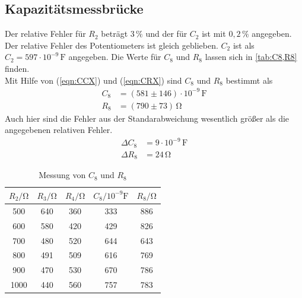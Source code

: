 \documentclass[
  bibliography=totoc,     %
  captions=tableheading,  %
  titlepage=firstiscover, %
]{scrartcl}
\begin{document}
  \subsection{Kapazitätsmessbrücke}
  Der relative Fehler für $R_2$ beträgt $3\,\%$ und der für $C_2$ ist mit $0,2 \,\%$ angegeben. Der relative Fehler des Potentiometers ist gleich geblieben.
  $C_2$ ist als $C_2 = 597 \cdot 10^{-9}\,\unit{\farad}$ angegeben. Die Werte für $C_8$ und $R_8$ lassen sich in \autoref{tab:C8,R8} finden.\\
  Mit Hilfe von (\autoref{eqn:CCX}) und (\autoref{eqn:CRX}) sind $C_8$ und $R_8$ bestimmt als
  \begin{align*}
    C_8 &= (581 \pm 146)\cdot 10^{-9} \,\unit{\farad} \\
    R_8 &= (790 \pm 73)\,\unit{\ohm}
  \end{align*}
  Auch hier sind die Fehler aus der Standarabweichung wesentlich größer als die angegebenen relativen Fehler.
  \begin{align*}
    \Delta C_{8} &= 9\cdot 10^{-9}\,\unit{\farad} \\
    \Delta R_{8} &= 24\,\unit{\ohm}
  \end{align*}


  \begin{table}[h]
    \centering
    \caption{Messung von $C_8$ und $R_8$}
    \label{tab:C8,R8}
    \begin{tabular}{c c c c c}
      \toprule
      $R_2/\unit{\ohm}$ & $R_3/\unit{\ohm}$ & $R_4/\unit{\ohm}$ & $C_8/10^{-9}\unit{\farad}$ & $R_8/\unit{\ohm}$ \\
      \midrule
      500 & 640 & 360 & 333 & 886 \\
      600 & 580 & 420 & 429 & 826 \\
      700 & 480 & 520 & 644 & 643 \\
      800 & 491 & 509 & 616 & 769 \\
      900 & 470 & 530 & 670 & 786 \\
      1000 & 440 & 560 & 757 & 783 \\
      \bottomrule
    \end{tabular}
  \end{table}
  \FloatBarrier
\end{document}
